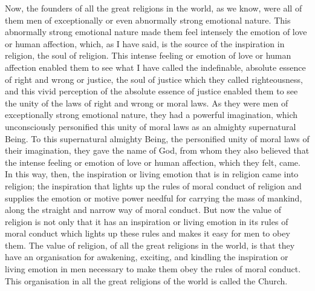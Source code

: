 Now, the founders of all the great religions in the world, as we know, were all of them men of exceptionally or even abnormally strong emotional nature.
This abnormally strong emotional nature made them feel intensely the emotion of love or human affection, which, as I have said, is the source of the inspiration in religion, the soul of religion.
This intense feeling or emotion of love or human affection enabled them to see what I have called the indefinable, absolute essence of right and wrong or justice, the soul of justice which they called righteousness, and this vivid perception of the absolute essence of justice enabled them to see the unity of the laws of right and wrong or moral laws.
As they were men of exceptionally strong emotional nature, they had a powerful imagination, which unconsciously personified this unity of moral laws as an almighty supernatural Being.
To this supernatural almighty Being, the personified unity of moral laws of their imagination, they gave the name of God, from whom they also believed that the intense feeling or emotion of love or human affection, which they felt, came.
In this way, then, the inspiration or living emotion that is in religion came into religion; the inspiration that lights up the rules of moral conduct of religion and supplies the emotion or motive power needful for carrying the mass of mankind, along the straight and narrow way of moral conduct.
But now the value of religion is not only that it has an inspiration or living emotion in its rules of moral conduct which lights up these rules and makes it easy for men to obey them.
The value of religion, of all the great religions in the world, is that they have an organisation for awakening, exciting, and kindling the inspiration or living emotion in men necessary to make them obey the rules of moral conduct.
This organisation in all the great religions of the world is called the Church.


